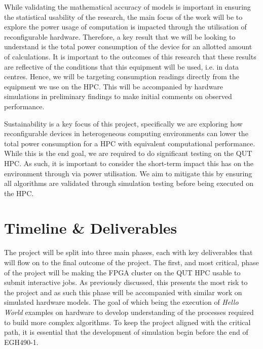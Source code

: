 \documentclass[11pt, a4paper]{article}
\begin{document}
	While validating the mathematical accuracy of models is important in ensuring the statistical usability of the research, the main focus of the work will be to explore the power usage of computation is impacted through the utilisation of reconfigurable hardware. Therefore, a key result that we will be looking to understand is the total power consumption of the device for an allotted amount of calculations. It is important to the outcomes of this research that these results are reflective of the conditions that this equipment will be used, i.e. in data centres. Hence, we will be targeting consumption readings directly from the equipment we use on the HPC. This will be accompanied by hardware simulations in preliminary findings to make initial comments on observed performance.
	
	Sustainability is a key focus of this project, specifically we are exploring how reconfigurable devices in heterogeneous computing environments can lower the total power consumption for a HPC with equivalent computational performance. While this is the end goal, we are required to do significant testing on the QUT HPC. As such, it is important to consider the short-term impact this has on the environment through via power utilisation. We aim to mitigate this by ensuring all algorithms are validated through simulation testing before being executed on the HPC. 
	
	\section{Timeline \& Deliverables}
	The project will be split into three main phases, each with key deliverables that will flow on to the final outcome of the project. The first, and most critical, phase of the project will be making the FPGA cluster on the QUT HPC usable to submit interactive jobs. As previously discussed, this presents the most risk to the project and as such this phase will be accompanied with similar work on simulated hardware models. The goal of which being the execution of \textit{Hello World} examples on hardware to develop understanding of the processes required to build more complex algorithms. To keep the project aligned with the critical path, it is essential that the development of simulation begin before the end of EGH490-1. 
	
\end{document}
